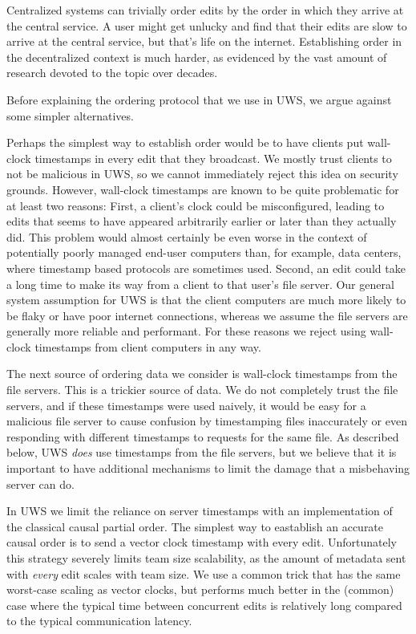 \documentclass{article}
\begin{document}
Centralized systems can trivially order edits by the order in which they arrive at the central service.
A user might get unlucky and find that their edits are slow to arrive at the central service, but that's life on the internet.
Establishing order in the decentralized context is much harder, as evidenced by the vast amount of research devoted to the topic over decades.

Before explaining the ordering protocol that we use in UWS, we argue against some simpler alternatives.

Perhaps the simplest way to establish order would be to have clients put wall-clock timestamps in every edit that they broadcast.
We mostly trust clients to not be malicious in UWS, so we cannot immediately reject this idea on security grounds.
However, wall-clock timestamps are known to be quite problematic for at least two reasons:
First, a client's clock could be misconfigured, leading to edits that seems to have appeared arbitrarily earlier or later than they actually did.
This problem would almost certainly be even worse in the context of potentially poorly managed end-user computers than, for example, data centers, where timestamp based protocols are sometimes used.
Second, an edit could take a long time to make its way from a client to that user's file server.
Our general system assumption for UWS is that the client computers are much more likely to be flaky or have poor internet connections, whereas we assume the file servers are generally more reliable and performant.
For these reasons we reject using wall-clock timestamps from client computers in any way.

The next source of ordering data we consider is wall-clock timestamps from the file servers.
This is a trickier source of data.
We do not completely trust the file servers, and if these timestamps were used naively, it would be easy for a malicious file server to cause confusion by timestamping files inaccurately or even responding with different timestamps to requests for the same file.
As described below, UWS \emph{does} use timestamps from the file servers, but we believe that it is important to have additional mechanisms to limit the damage that a misbehaving server can do.

In UWS we limit the reliance on server timestamps with an implementation of the classical causal partial order.
The simplest way to eastablish an accurate causal order is to send a vector clock timestamp with every edit.
Unfortunately this strategy severely limits team size scalability, as the amount of metadata sent with \emph{every} edit scales with team size.
We use a common trick that has the same worst-case scaling as vector clocks, but performs much better in the (common) case where the typical time between concurrent edits is relatively long compared to the typical communication latency.
\end{document}
